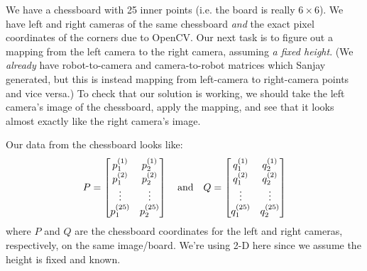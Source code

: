 \documentclass[10pt,twoside]{book}
\begin{document}
We have a chessboard with 25 inner points (i.e. the board is really $6\times
6$). We have left and right cameras of the same chessboard \emph{and} the exact
pixel coordinates of the corners due to OpenCV. Our next task is to figure out a
mapping from the left camera to the right camera, assuming \emph{a fixed
height}. (We \emph{already} have robot-to-camera and camera-to-robot matrices
which Sanjay generated, but this is instead mapping from left-camera to
right-camera points and vice versa.)  To check that our solution is working, we
should take the left camera's image of the chessboard, apply the mapping, and
see that it looks almost exactly like the right camera's image.

Our data from the chessboard looks like:
\begin{equation}
P =
\begin{bmatrix}
p_1^{(1)} & p_2^{(1)} \\
p_1^{(2)} & p_2^{(2)} \\
\vdots & \vdots \\
p_1^{(25)} & p_2^{(25)}
\end{bmatrix}
\quad {\rm and} \quad
Q =
\begin{bmatrix}
q_1^{(1)} & q_2^{(1)} \\
q_1^{(2)} & q_2^{(2)} \\
\vdots & \vdots \\
q_1^{(25)} & q_2^{(25)}
\end{bmatrix}
\end{equation}
where $P$ and $Q$ are the chessboard coordinates for the left and right cameras,
respectively, on the same image/board. {We're using 2-D here since we assume the
height is fixed and known.}
\end{document}

